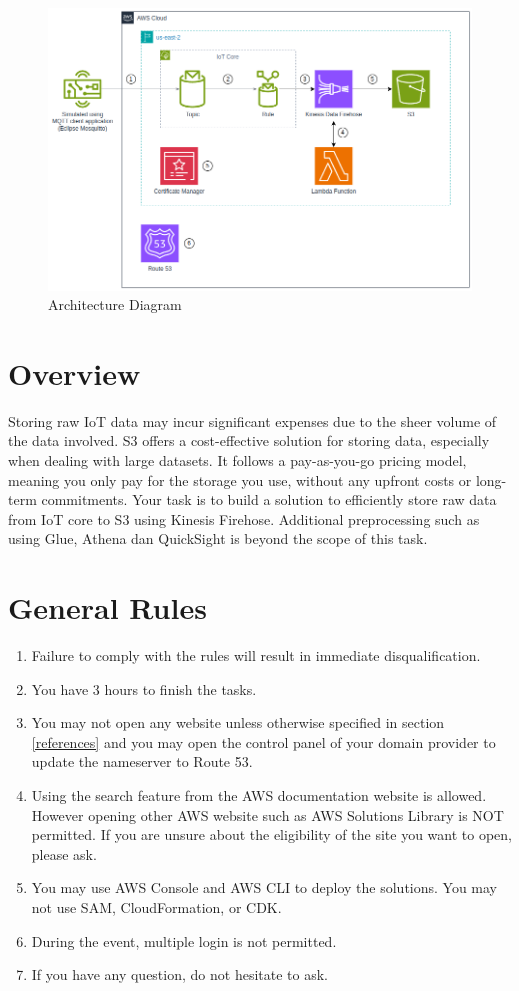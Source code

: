 \documentclass{article}
\begin{document}
\begin{figure}[h]
\centering
\includegraphics[width=\textwidth]{assets/architecture.png}
\caption{\label{fig:architecture}Architecture Diagram}
\end{figure}

\section{Overview}
Storing raw IoT data may incur significant expenses due to the sheer volume of the data involved.
S3 offers a cost-effective solution for storing data, especially when dealing with large datasets. It follows a pay-as-you-go pricing model, meaning you only pay for the storage you use, without any upfront costs or long-term commitments.
Your task is to build a solution to efficiently store raw data from IoT core to S3 using Kinesis Firehose. Additional preprocessing such as using Glue, Athena dan QuickSight is beyond the scope of this task.

\section{General Rules}
\begin{enumerate}
    \item Failure to comply with the rules will result in immediate disqualification.
    \item You have 3 hours to finish the tasks.
    \item You may not open any website unless otherwise specified in section \ref{references} and you may open the control panel of your domain provider to update the nameserver to Route 53.
    \item Using the search feature from the AWS documentation website is allowed. However opening other AWS website such as AWS Solutions Library is NOT permitted. If you are unsure about the eligibility of the site you want to open, please ask.
    \item You may use AWS Console and AWS CLI to deploy the solutions. You may not use SAM, CloudFormation, or CDK.
    \item During the event, multiple login is not permitted.
    \item If you have any question, do not hesitate to ask.
\end{enumerate}
\end{document}
